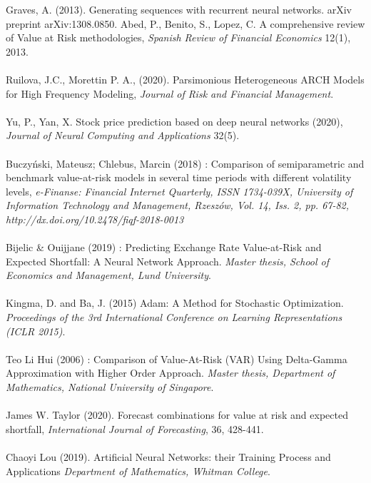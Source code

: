 \documentclass[a4paper,11pt,oneside]{book}
\begin{document}
Graves, A. (2013). Generating sequences with recurrent neural networks. arXiv preprint arXiv:1308.0850.\newline\newline
Abed, P., Benito, S., Lopez, C. A comprehensive review of Value at Risk methodologies, \textit{Spanish Review of Financial Economics} 12(1), 2013. \\\\
Ruilova, J.C., Morettin P. A., (2020). Parsimonious Heterogeneous ARCH Models for High
Frequency Modeling, \textit{Journal of Risk and Financial Management}.\\\\
Yu, P., Yan, X. Stock price prediction based on deep neural networks (2020), \textit{Journal of Neural Computing and Applications} 32(5).\\\\
Buczyński, Mateusz; Chlebus, Marcin (2018) : Comparison of semiparametric
and benchmark value-at-risk models in several time periods with different volatility
levels, \textit{e-Finanse: Financial Internet Quarterly, ISSN 1734-039X, University of Information
Technology and Management, Rzeszów, Vol. 14, Iss. 2, pp. 67-82,
http://dx.doi.org/10.2478/fiqf-2018-0013}\\\\
Bijelic \& Ouijjane (2019) : Predicting Exchange Rate
Value-at-Risk and Expected Shortfall:
A Neural Network Approach. \textit{Master thesis, School of Economics and Management, Lund University}.\\\\
Kingma, D. and Ba, J. (2015) Adam: A Method for Stochastic Optimization. \textit{Proceedings of the 3rd International Conference on Learning Representations (ICLR 2015)}.\\\\
Teo Li Hui (2006) : Comparison of Value-At-Risk (VAR) Using Delta-Gamma
Approximation with Higher Order Approach. \textit{Master thesis, Department of Mathematics, National University of Singapore}.\\\\
James W. Taylor (2020). Forecast combinations for value at risk and expected shortfall, \textit{International Journal of Forecasting}, 36, 428-441.\\\\
Chaoyi Lou (2019). Artificial Neural Networks:
their Training Process and Applications \textit{Department of Mathematics, Whitman College}.\\\\
\end{document}
